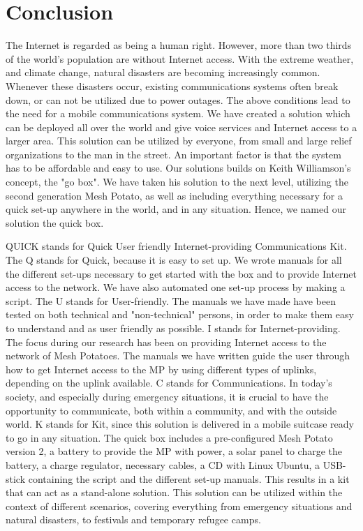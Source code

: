 \chapter{Conclusion}
\label{chp:conclusion} 

The Internet is regarded as being a human right. However, more than two thirds of the world's population are without Internet access. With the extreme weather, and climate change, natural disasters are becoming increasingly common. Whenever these disasters occur, existing communications systems often break down, or can not be utilized due to power outages. The above conditions lead to the need for a mobile communications system. We have created a solution which can be deployed all over the world and give voice services and Internet access to a larger area. This solution can be utilized by everyone, from small and large relief organizations to the man in the street. An important factor is that the system has to be affordable and easy to use. Our solutions builds on Keith Williamson's concept, the "go box". We have taken his solution to the next level, utilizing the second generation Mesh Potato, as well as including everything necessary for a quick set-up anywhere in the world, and in any situation. Hence, we named our solution the \gls{quick} box. 

QUICK stands for Quick User friendly Internet-providing Communications Kit. The Q stands for Quick, because it is easy to set up. We wrote manuals for all the different set-ups necessary to get started with the box and to provide Internet access to the network. We have also automated one set-up process by making a script. The U stands for User-friendly. The manuals we have made have been tested on both technical and "non-technical" persons, in order to make them easy to understand and as user friendly as possible. I stands for Internet-providing. The focus during our research has been on providing Internet access to the network of Mesh Potatoes. The manuals we have written guide the user through how to get Internet access to the MP by using different types of uplinks, depending on the uplink available. C stands for Communications. In today's society, and especially during emergency situations, it is crucial to have the opportunity to communicate, both within a community, and with the outside world. K stands for Kit, since this solution is delivered in a mobile suitcase ready to go in any situation. The \gls{quick} box includes a pre-configured Mesh Potato version 2, a battery to provide the MP with power, a solar panel to charge the battery, a charge regulator, necessary cables, a CD with Linux Ubuntu, a USB-stick containing the script and the different set-up manuals. 
This results in a kit that can act as a stand-alone solution. This solution can be utilized within the context of different scenarios, covering everything from emergency situations and natural disasters, to festivals and temporary refugee camps.

